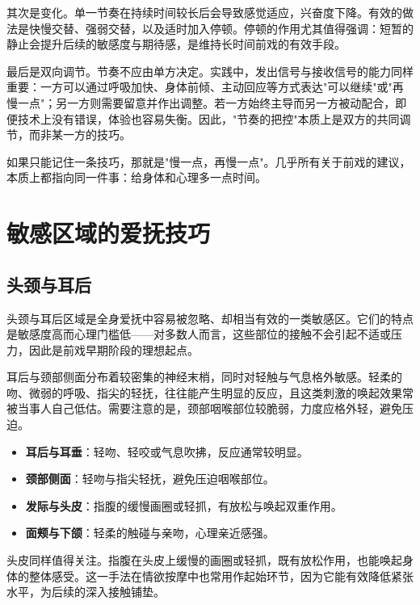 \documentclass[12pt,UTF8]{ctexbook}
\newcommand{\keyword}[1]{\textbf{#1}}
\begin{document}
其次是变化。单一节奏在持续时间较长后会导致感觉适应，兴奋度下降。有效的做法是快慢交替、强弱交替，以及适时加入停顿。停顿的作用尤其值得强调：短暂的静止会提升后续的敏感度与期待感，是维持长时间前戏的有效手段。

最后是双向调节。节奏不应由单方决定。实践中，发出信号与接收信号的能力同样重要：一方可以通过呼吸加快、身体前倾、主动回应等方式表达"可以继续"或"再慢一点"；另一方则需要留意并作出调整。若一方始终主导而另一方被动配合，即便技术上没有错误，体验也容易失衡。因此，"节奏的把控"本质上是双方的共同调节，而非某一方的技巧。

\begin{tcolorbox}[colback=pink!5!white,colframe=red!50!black,title=贴心小叮咛]
如果只能记住一条技巧，那就是"慢一点，再慢一点"。几乎所有关于前戏的建议，本质上都指向同一件事：给身体和心理多一点时间。
\end{tcolorbox}

\section{敏感区域的爱抚技巧}
\subsection{头颈与耳后}

头颈与耳后区域是全身爱抚中容易被忽略、却相当有效的一类敏感区。它们的特点是敏感度高而心理门槛低——对多数人而言，这些部位的接触不会引起不适或压力，因此是前戏早期阶段的理想起点。

耳后与颈部侧面分布着较密集的神经末梢，同时对轻触与气息格外敏感。轻柔的吻、微弱的呼吸、指尖的轻抚，往往能产生明显的反应，且这类刺激的唤起效果常被当事人自己低估。需要注意的是，颈部咽喉部位较脆弱，力度应格外轻，避免压迫。

\begin{itemize}
  \item \keyword{耳后与耳垂}：轻吻、轻咬或气息吹拂，反应通常较明显。
  \item \keyword{颈部侧面}：轻吻与指尖轻抚，避免压迫咽喉部位。
  \item \keyword{发际与头皮}：指腹的缓慢画圈或轻抓，有放松与唤起双重作用。
  \item \keyword{面颊与下颌}：轻柔的触碰与亲吻，心理亲近感强。
\end{itemize}

头皮同样值得关注。指腹在头皮上缓慢的画圈或轻抓，既有放松作用，也能唤起身体的整体感受。这一手法在情欲按摩中也常用作起始环节，因为它能有效降低紧张水平，为后续的深入接触铺垫。
\end{document}
